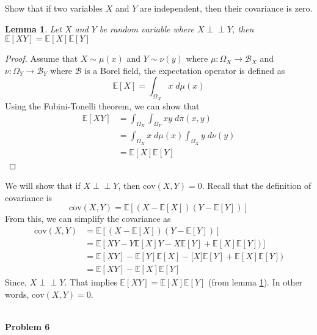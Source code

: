 \documentclass{article}
\newtheorem{lemma}[theorem]{Lemma}
\newcommand{\indep}{\perp \!\!\! \perp}
\begin{document}
Show that if two variables $X$ and $Y$ are independent, then their covariance is zero. 
\color{blue}
\begin{lemma}
\label{lemma:indepexp}
Let $X$ and $Y$ be random variable where $X\indep Y$, then $\mathbb{E}[XY] =  \mathbb{E}[X] \mathbb{E}[Y]$
\end{lemma}
\begin{proof}
    Assume that $X\sim \mu(x)$ and $Y\sim \nu(y)$ where $\mu:\Omega_X\to\mathcal{B}_X$ and $\nu:\Omega_Y\to\mathcal{B}_Y$ where $\mathcal{B}$ is a Borel field, the expectation operator is defined as
    $$\mathbb{E}[X] = \int_{\Omega_X} x\;d\mu(x)$$
    Using the Fubini-Tonelli theorem, we can show that
    \begin{align*}
    \mathbb{E}[XY] &= \int_{\Omega_X}\int_{\Omega_Y} xy\;d\pi(x,y)\\
    &= \int_{\Omega_X} x\;d\mu(x)\int_{\Omega_X} y\;d\nu(y)\\
    &= \mathbb{E}[X]\mathbb{E}[Y]
    \end{align*}
\end{proof}
\begin{sol}
We will show that if $X\indep Y$, then $\text{cov}(X,Y) = 0$.
Recall that the definition of covariance is 
\begin{equation}\text{cov}(X,Y) = \mathbb{E}\left[(X-\mathbb{E}[X])(Y-\mathbb{E}[Y])\right]\end{equation}
From this, we can simplify the covariance as
\begin{align*}
    \text{cov}(X,Y) &= \mathbb{E}\left[(X-\mathbb{E}[X])(Y-\mathbb{E}[Y])\right] \\
     &= \mathbb{E}\left[XY-Y\mathbb{E}[X]Y - X\mathbb{E}[Y]  +\mathbb{E}[X] \mathbb{E}[Y])\right] \\
     &= \mathbb{E}[XY] - \mathbb{E}[Y]\mathbb{E}[X] - \mathbb[X]\mathbb{E}[Y]  +\mathbb{E}[X] \mathbb{E}[Y]) \\
     &= \mathbb{E}[XY] - \mathbb{E}[X] \mathbb{E}[Y]
\end{align*}
Since, $X\indep Y$. That implies $\mathbb{E}[XY] =  \mathbb{E}[X] \mathbb{E}[Y]$ (from lemma \ref{lemma:indepexp}). In other words, $\text{cov}(X,Y) = 0$.
\end{sol}
\color{black}
\leavevmode\\
\noindent
\Large{\textbf{Problem 6}}\normalsize
\\
\end{document}
